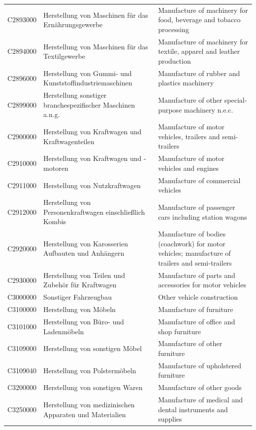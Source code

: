 \begin{longtable}{|p{3cm}|p{6cm}|p{6cm}|}
 C2893000   & Herstellung von Maschinen für das Ernährungsgewerbe   & Manufacture of machinery for food, beverage and tobacco processing    \\
 C2894000   & Herstellung von Maschinen für das Textilgewerbe   & Manufacture of machinery for textile, apparel and leather production    \\
 C2896000   & Herstellung von Gummi- und Kunststoffindustriemaschinen   & Manufacture of rubber and plastics machinery    \\
 C2899000   & Herstellung sonstiger branchespezifischer Maschinen a.n.g.   & Manufacture of other special-purpose machinery n.e.c.    \\
 C2900000   & Herstellung von Kraftwagen und Kraftwagenteilen   & Manufacture of motor vehicles, trailers and semi-trailers    \\
 C2910000   & Herstellung von Kraftwagen und -motoren   & Manufacture of motor vehicles and engines    \\
 C2911000   & Herstellung von Nutzkraftwagen   & Manufacture of commercial vehicles    \\
 C2912000   & Herstellung von Personenkraftwagen einschließlich Kombis   & Manufacture of passenger cars including station wagons    \\
 C2920000   & Herstellung von Karosserien Aufbauten und Anhängern   & Manufacture of bodies (coachwork) for motor vehicles; manufacture of trailers and semi-trailers    \\
 C2930000   & Herstellung von Teilen und Zubehör für Kraftwagen   & Manufacture of parts and accessories for motor vehicles    \\
 C3000000   & Sonstiger Fahrzeugbau   & Other vehicle construction    \\
 C3100000   & Herstellung von Möbeln   & Manufacture of furniture    \\
 C3101000   & Herstellung von Büro- und Ladenmöbeln   & Manufacture of office and shop furniture    \\
 C3109000   & Herstellung von sonstigen Möbel   & Manufacture of other furniture    \\
 C3109040   & Herstellung von Polstermöbeln   & Manufacture of upholstered furniture    \\
 C3200000   & Herstellung von sonstigen Waren   & Manufacture of other goods    \\
 C3250000   & Herstellung von medizinischen Apparaten und Materialien   & Manufacture of medical and dental instruments and supplies    \\

\end{longtable}
